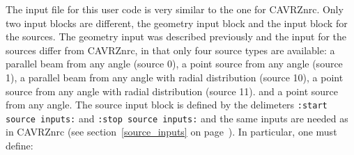 \documentclass[12pt,twoside]{article}  %
\begin{document}
The input file for this user code is very similar to the one for
CAVRZnrc. Only two input blocks are different, the geometry input block
and the input block for the sources. The geometry input was described
previously and the input for the sources differ from CAVRZnrc, in that
only four source types are available: a parallel beam from any angle
(source 0), a point source from any angle (source 1), a parallel beam
from any angle with radial distribution (source 10), a point source from
any angle with radial distribution (source 11).
and a point source from any angle. The source input block is defined by
the delimeters {\tt :start source inputs:} and {\tt :stop source inputs:}
and the same inputs are needed as in CAVRZnrc (see
section~\ref{source_inputs} on page~\pageref{source_inputs}).  In
particular, one must define:
\end{document}
